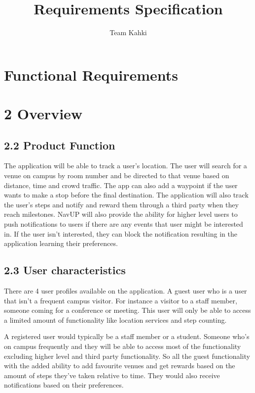 \documentclass[11pt]{article}
\author{Team Kahki}
\title{Requirements Specification}
\begin{document}
	\setlength{\parskip}{6pt}
	
	
	
	\tableofcontents
	\newpage
		
	\section{Functional Requirements}
	
	\section {2 Overview}
	
	\subsection{2.2 Product Function}
		The application will be able to track a user’s location. The user will search for a venue on campus by room number and 			be directed to that venue based on distance, time and crowd traffic. The app can also add a waypoint if the user wants 			to make a stop before the final destination. The application will also track the user’s steps and notify and reward them 		 through a third party when they reach milestones. NavUP will also provide the ability for higher level users to push 			notifications to users if there are any events that user might be interested in. If the user isn’t interested, they can 		block the notification resulting in the application learning their preferences. 

	\subsection{2.3 User characteristics}
		There are 4 user profiles available on the application. A guest user who is a user that isn’t a frequent campus visitor. 		 For instance a visitor to a staff member, someone coming for a conference or meeting. This user will only be able to 			access a limited amount of functionality like location services and step counting.  

		A registered user would typically be a staff member or a student. Someone who’s on campus frequently and they will be 			able to access most of the functionality excluding higher level and third party functionality. So all the guest 			functionality with the added ability to add favourite venues and get rewards based on the amount of steps they’ve taken 		relative to time. They would also receive notifications based on their preferences.
\end{document}
